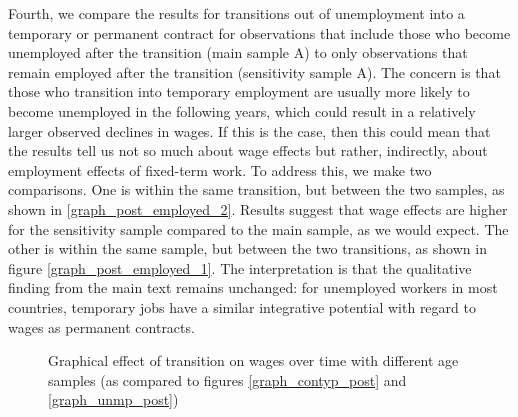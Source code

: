 Fourth, we compare the results for transitions out of unemployment into a temporary or permanent contract for observations that include those who become unemployed after the transition (main sample A) to only observations that remain employed after the transition (sensitivity sample A).  The concern is that those who transition into temporary employment are usually more likely to become unemployed in the following years, which could result in a relatively larger observed declines in wages. If this is the case, then this could mean that the results tell us not so much about wage effects but rather, indirectly, about employment effects of fixed-term work. To address this, we make two comparisons.  One is within the same transition, but between the two samples, as shown in \ref{graph_post_employed_2}.  Results suggest that wage effects are higher for the sensitivity sample compared to the main sample, as we would expect.  The other is within the same sample, but between the two transitions, as shown in figure \ref{graph_post_employed_1}.  The interpretation is that the qualitative finding from the main text remains unchanged: for unemployed workers in most countries, temporary jobs have a similar integrative potential with regard to wages as permanent contracts.  

\begin{figure}
    \caption{Graphical effect of transition on wages over time with different age samples (as compared to figures \ref{graph_contyp_post} and  \ref{graph_unmp_post})}
    \label{graph_post_age_16_64}
\end{figure}

